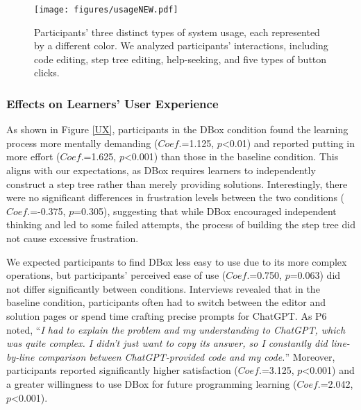 \begin{figure*}[htbp]
	\centering 
	\texttt{[image: figures/usageNEW.pdf]}
	\caption{Participants' three distinct types of system usage, each represented by a different color. We analyzed participants' interactions, including code editing, step tree editing, help-seeking, and five types of button clicks.}
	\label{usage}
        \Description{}
\end{figure*}



\subsubsection{Effects on Learners' User Experience}
\label{Effects_on_UX}
As shown in Figure \ref{UX}, participants in the DBox condition found the learning process more mentally demanding ($Coef.$=1.125, $p$<0.01) and reported putting in more effort ($Coef.$=1.625, $p$<0.001) than those in the baseline condition. This aligns with our expectations, as DBox requires learners to independently construct a step tree rather than merely providing solutions. Interestingly, there were no significant differences in frustration levels between the two conditions ($Coef.$=-0.375, $p$=0.305), suggesting that while DBox encouraged independent thinking and led to some failed attempts, the process of building the step tree did not cause excessive frustration. 



We expected participants to find DBox less easy to use due to its more complex operations, but participants' perceived ease of use ($Coef.$=0.750, $p$=0.063) did not differ significantly between conditions. Interviews revealed that in the baseline condition, participants often had to switch between the editor and solution pages or spend time crafting precise prompts for ChatGPT. As P6 noted, ``\emph{I had to explain the problem and my understanding to ChatGPT, which was quite complex. I didn't just want to copy its answer, so I constantly did line-by-line comparison between ChatGPT-provided code and my code.}'' Moreover, participants reported significantly higher satisfaction ($Coef.$=3.125, $p$<0.001) and a greater willingness to use DBox for future programming learning ($Coef.$=2.042, $p$<0.001).

